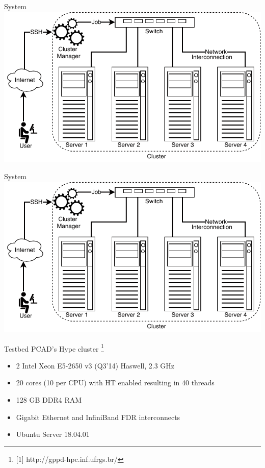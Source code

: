 \documentclass[presentation]{beamer}
\begin{document}
\begin{frame}{System}
    \includegraphics[width=\textwidth]{SLIDES/img/System.pdf}
\end{frame}

\begin{frame}{System}
    \includegraphics[width=\textwidth]{SLIDES/img/System.pdf}
\end{frame}

\begin{frame}{Testbed}
PCAD's Hype cluster \footnote{[1] http://gppd-hpc.inf.ufrgs.br/}
\begin{itemize}
\item 2 \texttimes{} Intel Xeon E5-2650 v3 (Q3'14) Haswell, 2.3 GHz
\item 20 cores (10 per CPU) with HT enabled resulting in 40 threads
\item 128 GB DDR4 RAM
\item Gigabit Ethernet and InfiniBand FDR interconnects
\item Ubuntu Server 18.04.01
\vfill
\end{itemize}
\vfill
\end{frame}
\end{document}
